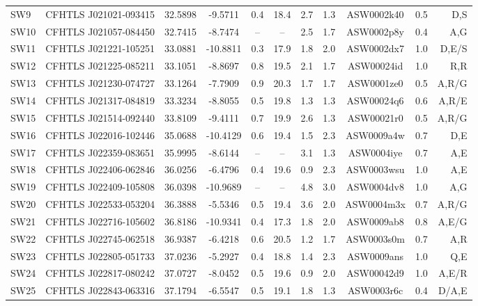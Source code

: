 \documentclass[useAMS,usenatbib,a4paper]{mn2e}
\begin{document}
\begin{center}
\begin{longtable}{lcccccccccr}
 SW9 & CFHTLS J021021-093415 &   32.5898 &   -9.5711 &  0.4 & 18.4 &  2.7 &  1.3 & ASW0002k40 &  0.5  &  D,S   \\ 
SW10 & CFHTLS J021057-084450 &   32.7415 &   -8.7474 &  --  &  --  &  2.5 &  1.7 & ASW0002p8y &  0.4  &  A,G   \\ 
SW11 & CFHTLS J021221-105251 &   33.0881 &  -10.8811 &  0.3 & 17.9 &  1.8 &  2.0 & ASW0002dx7 &  1.0  &  D,E/S   \\ 
SW12 & CFHTLS J021225-085211 &   33.1051 &   -8.8697 &  0.8 & 19.5 &  2.1 &  1.7 & ASW00024id &  1.0  &  R,R   \\ 
SW13 & CFHTLS J021230-074727 &   33.1264 &   -7.7909 &  0.9 & 20.3 &  1.7 &  1.7 & ASW0001ze0 &  0.5  &  A,R/G   \\ 
SW14 & CFHTLS J021317-084819 &   33.3234 &   -8.8055 &  0.5 & 19.8 &  1.3 &  1.3 & ASW00024q6 &  0.6  &  A,R/E   \\ 
SW15 & CFHTLS J021514-092440 &   33.8109 &   -9.4111 &  0.7 & 19.9 &  2.6 &  1.3 & ASW00021r0 &  0.5  &  A,R/G   \\ 
SW16 & CFHTLS J022016-102446 &   35.0688 &  -10.4129 &  0.6 & 19.4 &  1.5 &  2.3 & ASW0009a4w &  0.7  &  D,E   \\ 
SW17 & CFHTLS J022359-083651 &   35.9995 &   -8.6144 &  --  &  --  &  3.1 &  1.3 & ASW0004iye &  0.7  &  A,E   \\ 
SW18 & CFHTLS J022406-062846 &   36.0256 &   -6.4796 &  0.4 & 19.6 &  0.9 &  2.3 & ASW0003wsu &  1.0  &  A,E   \\ 
SW19 & CFHTLS J022409-105808 &   36.0398 &  -10.9689 &  --  &  --  &  4.8 &  3.0 & ASW0004dv8 &  1.0  &  A,G   \\ 
SW20 & CFHTLS J022533-053204 &   36.3888 &   -5.5346 &  0.5 & 19.4 &  3.6 &  2.0 & ASW0004m3x &  0.7  &  A,R/G   \\ 
SW21 & CFHTLS J022716-105602 &   36.8186 &  -10.9341 &  0.4 & 17.3 &  1.8 &  2.0 & ASW0009ab8 &  0.8  &  A,E/G   \\ 
SW22 & CFHTLS J022745-062518 &   36.9387 &   -6.4218 &  0.6 & 20.5 &  1.2 &  1.7 & ASW0003s0m &  0.7  &  A,R   \\ 
SW23 & CFHTLS J022805-051733 &   37.0236 &   -5.2927 &  0.4 & 18.8 &  1.4 &  2.3 & ASW0009ans &  1.0  &  Q,E   \\ 
SW24 & CFHTLS J022817-080242 &   37.0727 &   -8.0452 &  0.5 & 19.6 &  0.9 &  2.0 & ASW00042d9 &  1.0  &  A,E/R   \\ 
SW25 & CFHTLS J022843-063316 &   37.1794 &   -6.5547 &  0.5 & 19.1 &  1.8 &  1.3 & ASW0003r6c &  0.4  &  D/A,E   \\ 

\end{longtable}
\end{center}
\end{document}
